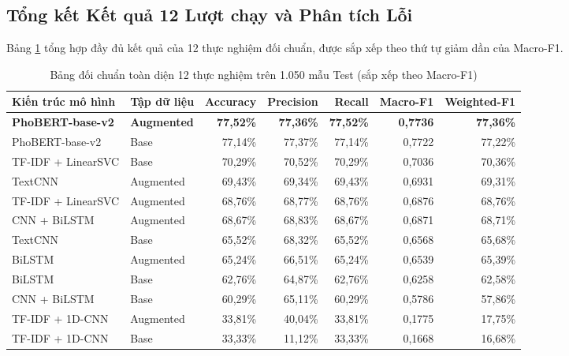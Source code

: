 \documentclass[a4paper,11pt]{article}
\begin{document}
\subsection{Tổng kết Kết quả 12 Lượt chạy và Phân tích Lỗi}
Bảng \ref{tab:text_12_runs} tổng hợp đầy đủ kết quả của 12 thực nghiệm đối chuẩn, được sắp xếp theo thứ tự giảm dần của Macro-F1.

\begin{table}[H]
\centering
\caption{Bảng đối chuẩn toàn diện 12 thực nghiệm trên 1.050 mẫu Test (sắp xếp theo Macro-F1)}
\label{tab:text_12_runs}
\small
\begin{tabular}{llrrrrr}
\toprule
\textbf{Kiến trúc mô hình} & \textbf{Tập dữ liệu} & \textbf{Accuracy} & \textbf{Precision} & \textbf{Recall} & \textbf{Macro-F1} & \textbf{Weighted-F1} \\
\midrule
\textbf{PhoBERT-base-v2} & \textbf{Augmented} & \textbf{77{,}52\%} & \textbf{77{,}36\%} & \textbf{77{,}52\%} & \textbf{0{,}7736} & \textbf{77{,}36\%} \\
PhoBERT-base-v2          & Base               & 77{,}14\% & 77{,}37\% & 77{,}14\% & 0{,}7722 & 77{,}22\% \\
TF-IDF + LinearSVC       & Base               & 70{,}29\% & 70{,}52\% & 70{,}29\% & 0{,}7036 & 70{,}36\% \\
TextCNN                  & Augmented          & 69{,}43\% & 69{,}34\% & 69{,}43\% & 0{,}6931 & 69{,}31\% \\
TF-IDF + LinearSVC       & Augmented          & 68{,}76\% & 68{,}77\% & 68{,}76\% & 0{,}6876 & 68{,}76\% \\
CNN + BiLSTM             & Augmented          & 68{,}67\% & 68{,}83\% & 68{,}67\% & 0{,}6871 & 68{,}71\% \\
TextCNN                  & Base               & 65{,}52\% & 68{,}32\% & 65{,}52\% & 0{,}6568 & 65{,}68\% \\
BiLSTM                   & Augmented          & 65{,}24\% & 66{,}51\% & 65{,}24\% & 0{,}6539 & 65{,}39\% \\
BiLSTM                   & Base               & 62{,}76\% & 64{,}87\% & 62{,}76\% & 0{,}6258 & 62{,}58\% \\
CNN + BiLSTM             & Base               & 60{,}29\% & 65{,}11\% & 60{,}29\% & 0{,}5786 & 57{,}86\% \\
TF-IDF + 1D-CNN          & Augmented          & 33{,}81\% & 40{,}04\% & 33{,}81\% & 0{,}1775 & 17{,}75\% \\
TF-IDF + 1D-CNN          & Base               & 33{,}33\% & 11{,}12\% & 33{,}33\% & 0{,}1668 & 16{,}68\% \\
\bottomrule
\end{tabular}
\end{table}
\end{document}
